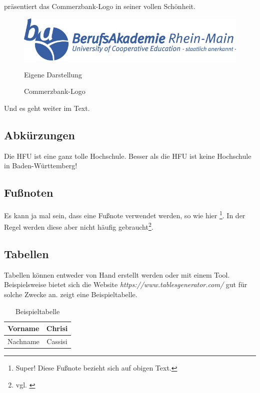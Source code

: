  präsentiert das Commerzbank-Logo in seiner vollen Schönheit.

\begin{figure}[h]
    \centering
    \includegraphics[width=1.0\textwidth]{figures/official_logo_ba.jpg}
    \caption{Commerzbank-Logo}
    Eigene Darstellung
    \label{fig:logo}
\end{figure}

Und es geht weiter im Text.

\subsection{Abkürzungen}

Die \ac{HFU} ist eine ganz tolle Hochschule. Besser als die \ac{HFU} ist keine Hochschule in Baden-Württemberg!

\subsection{Fußnoten}

Es kann ja mal sein, dass eine Fußnote verwendet werden, so wie hier \footnote{Super! Diese Fußnote bezieht sich auf obigen Text.}. In der Regel werden diese aber nicht häufig gebraucht\footnote{vgl. \cite{bieg2016finanzierung}}.

\subsection{Tabellen}

Tabellen können entweder von Hand erstellt werden oder mit einem Tool. Beispielsweise bietet sich die Website \textit{https://www.tablesgenerator.com/} gut für solche Zwecke an.  zeigt eine Beispieltabelle.

\begin{table}[htb]
    \centering
    \begin{tabular}{|c|c|}
        \hline
        Vorname & Chrisi  \\
        \hline
        Nachname & Cassisi \\
        \hline
    \end{tabular}
    \caption{Beispieltabelle}
    \label{tab:example_table}
\end{table}

